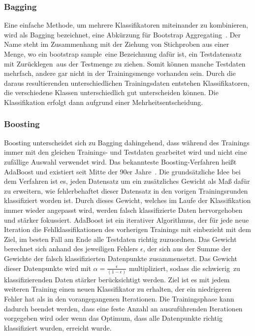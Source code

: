 \subsubsection*{Bagging}
Eine einfache Methode, um mehrere Klassifikatoren miteinander zu kombinieren, wird als Bagging bezeichnet, eine Abkürzung für Bootstrap Aggregating~\cite{Breiman96baggingpredictors}. Der Name steht im Zusammenhang mit der Ziehung von Stichproben aus einer Menge, wo ein \glqq bootstrap sample\grqq\ eine Bezeichnung dafür ist, ein Testdatensatz \glqq mit Zurücklegen\grqq\ aus der Testmenge zu ziehen. Somit können manche Testdaten mehrfach, andere gar nicht in der Trainingsmenge vorhanden sein. Durch die daraus resultierenden unterschiedlichen Trainingsdaten entstehen Klassifikatoren, die verschiedene Klassen unterschiedlich gut unterscheiden können. Die Klassifikation erfolgt dann aufgrund einer Mehrheitsentscheidung.

\subsubsection*{Boosting}
Boosting unterscheidet sich zu Bagging dahingehend, dass während des Trainings immer mit den gleichen Trainings- und Testdaten gearbeitet wird und nicht eine zufällige Auswahl verwendet wird.
Das bekannteste Boosting-Verfahren heißt AdaBoost und existiert seit Mitte der 90er Jahre~\cite{Freund95adecision-theoretic}. Die grundsätzliche Idee bei dem Verfahren ist es, jeden Datensatz um ein zusätzliches Gewicht als Maß dafür zu erweitern, wie fehlerbehaftet dieser Datensatz in den vorigen Trainingsrunden klassifiziert worden ist. Durch dieses Gewicht, welches im Laufe der Klassifikation immer wieder angepasst wird, werden falsch klassifizierte Daten hervorgehoben und stärker fokussiert. AdaBoost ist ein iterativer Algorithmus, der für jede neue Iteration die Fehlklassifikationen des vorherigen Trainings mit einbezieht mit dem Ziel, im besten Fall am Ende alle Testdaten richtig zuzuordnen. Das Gewicht berechnet sich anhand des jeweiligen Fehlers $\epsilon$, der sich aus der Summe der Gewichte der falsch klassifizierten Datenpunkte zusammensetzt. Das Gewicht dieser Datenpunkte wird mit
$ \alpha = \frac{\epsilon}{(1-\epsilon)} $ 
multipliziert, sodass die \glqq schwierig\grqq\ zu klassifizierenden Daten stärker berücksichtigt werden. Ziel ist es mit jedem weiteren Training einen neuen Klassifikator zu erhalten, der ein niedrigeren Fehler hat als in den vorangegangenen Iterationen. Die Trainingsphase kann dadurch beendet werden, dass eine feste Anzahl an auszuführenden Iterationen vorgegeben wird oder wenn das Optimum, dass alle Datenpunkte richtig klassifiziert wurden, erreicht wurde.

